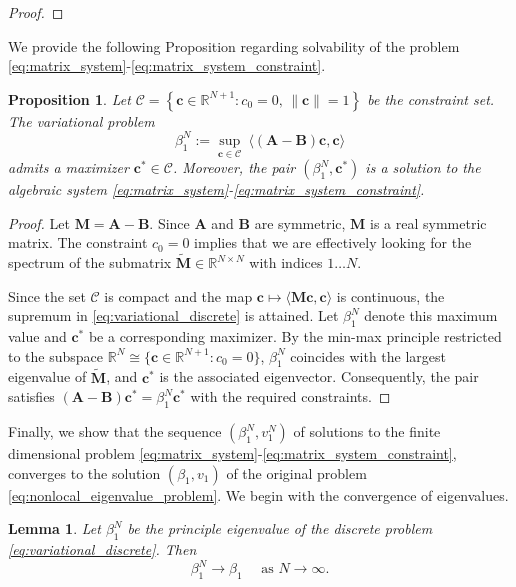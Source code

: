 \documentclass[11pt, a4paper]{article}
\theoremstyle{break}
\theoremstyle{break}
\newtheorem{prp}{Proposition}[section]
\theoremstyle{break}
\theoremstyle{break}
\theoremstyle{break}
\newtheorem{lem}{Lemma}[section]
\theoremstyle{break}
\theoremstyle{break}
\theoremstyle{break}
\theoremstyle{break}
\begin{document}
\begin{proof}
\end{proof}

We provide the following Proposition regarding solvability of the problem \eqref{eq:matrix_system}-\eqref{eq:matrix_system_constraint}.
\begin{prp}
    \label{prp:finite_dimensional_minimizer}
    Let $\mathcal{C} = \left\{ \mathbf{c} \in \mathbb{R}^{N+1} : c_0 = 0, \, \|\mathbf{c}\| = 1 \right\}$ be the constraint set. 
    The variational problem
    \begin{equation}
        \label{eq:variational_discrete}
        \beta_1^N := \sup_{\mathbf{c} \in \mathcal{C}} \: \langle (\mathbf{A} - \mathbf{B}) \mathbf{c}, \mathbf{c} \rangle
    \end{equation}
    admits a maximizer $\mathbf{c}^* \in \mathcal{C}$. Moreover, the pair $(\beta_1^N, \mathbf{c}^*)$ is a solution to the algebraic system \eqref{eq:matrix_system}-\eqref{eq:matrix_system_constraint}.
\end{prp}

\begin{proof}
    Let $\mathbf{M} = \mathbf{A} - \mathbf{B}$. Since $\mathbf{A}$ and $\mathbf{B}$ are symmetric, $\mathbf{M}$ is a real symmetric matrix. The constraint $c_0=0$ implies that we are effectively looking for the spectrum of the submatrix $\tilde{\mathbf{M}} \in \mathbb{R}^{N \times N}$ with indices $1 \dots N$.
    
    Since the set $\mathcal{C}$ is compact and the map $\mathbf{c} \mapsto \langle \mathbf{M}\mathbf{c}, \mathbf{c}\rangle$ is continuous, the supremum in \eqref{eq:variational_discrete} is attained. Let $\beta_1^N$ denote this maximum value and $\mathbf{c}^*$ be a corresponding maximizer. By the min-max principle restricted to the subspace $\mathbb{R}^N \cong \{ \mathbf{c} \in \mathbb{R}^{N+1} : c_0=0 \}$, $\beta_1^N$ coincides with the largest eigenvalue of $\tilde{\mathbf{M}}$, and $\mathbf{c}^*$ is the associated eigenvector. Consequently, the pair satisfies $(\mathbf{A}-\mathbf{B})\mathbf{c}^* = \beta_1^N \mathbf{c}^*$ with the required constraints.
\end{proof}

Finally, we show that the sequence $(\beta_1^N, v_1^N)$ of solutions to the finite dimensional problem \eqref{eq:matrix_system}-\eqref{eq:matrix_system_constraint}, converges to the solution $(\beta_1, v_1)$ of the original problem \eqref{eq:nonlocal_eigenvalue_problem}. We begin with the convergence of eigenvalues.

\begin{lem}
    \label{lem:convergence_principle_eigenvalue}
    Let $\beta_1^N$ be the principle eigenvalue of the discrete problem \eqref{eq:variational_discrete}. Then
    \begin{equation*}
        \beta_1^N \rightarrow \beta_1 \quad \text{ as } N \rightarrow \infty.
    \end{equation*}
\end{lem}
\end{document}
